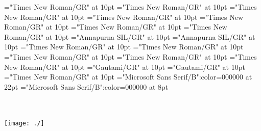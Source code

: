 \documentclass[a4paper]{article}
\begin{document}
\font\pictureRightentryletData="Times New Roman/GR" at 10pt
\font\picturepictureRightentryletData="Times New Roman/GR" at 10pt
\font\pictureCaptionpictureRightentryletData="Times New Roman/GR" at 10pt
\font\CmPicturepublishStemPileThumbnailPubpictureCaptionpictureRightentryletData="Times New Roman/GR" at 10pt
\font\spanenCmPicturepublishStemPileThumbnailPubpictureCaptionpictureRightentryletData="Times New Roman/GR" at 10pt
\font\pictureLabelenpictureCaptionpictureRightentryletData="Times New Roman/GR" at 10pt
\font\spanenpictureLabelenpictureCaptionpictureRightentryletData="Times New Roman/GR" at 10pt
\font\LexSensepublishStemGlossPubLehisensesensesentryletData="Annapurna SIL/GR" at 10pt
\font\spanhiLexSensepublishStemGlossPubLehisensesensesentryletData="Annapurna SIL/GR" at 10pt
\font\spanenLexSensepublishStemGlossPubLehisensesensesentryletData="Times New Roman/GR" at 10pt
\font\translationentranslationsexamplessensesensesentryletData="Times New Roman/GR" at 10pt
\font\xitementranslationentranslationsexamplessensesensesentryletData="Times New Roman/GR" at 10pt
\font\spanenxitementranslationentranslationsexamplessensesensesentryletData="Times New Roman/GR" at 10pt
\font\spanentranslationentranslationsexamplessensesensesentryletData="Times New Roman/GR" at 10pt
\font\xitemtetranslationentranslationsexamplessensesensesentryletData="Gautami/GR" at 10pt
\font\spantexitemtetranslationentranslationsexamplessensesensesentryletData="Gautami/GR" at 10pt
\font\spanenentryletData="Times New Roman/GR" at 10pt
\color{black} 
\thispagestyle{empty} 
\font\CoverPageTitle="Microsoft Sans Serif/B":color=000000 at 22pt 
\font\pFrontMatterdiv="Microsoft Sans Serif/B":color=000000 at 8pt 
\vskip 60pt 
\begin{center} 
\end{center} 
\newpage 
\newpage 
\thispagestyle{empty} 
\mbox{} 
\begin{titlepage}
\begin{center}
\textsc{\LARGE {}}\\[1.5cm] 
\vspace{110 mm} 
\textsc{ }\\[0.5cm] 
\texttt{[image: ./]}\\[1cm]    
\end{center} 
\end{titlepage} 
\setcounter{page}{3} 
 
\pagestyle{plain} 
\newpage 
\end{document}
